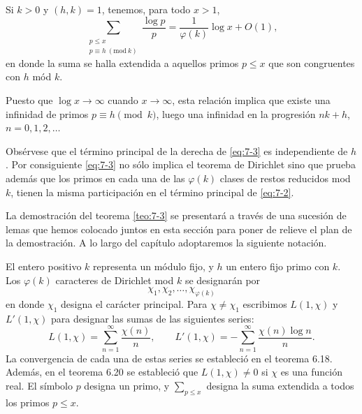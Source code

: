 \documentclass[12pt,a4paper]{book}
\begin{document}
    \begin{teorema}\label{teo:7-3}
        Si $k>0$ y $(h,k)=1$, tenemos, para todo $x>1$,
        \begin{equation}\label{eq:7-3}
            \sum_{\substack{p\leq x\\p\equiv h\ (\mathrm{mod}\ k)}}\frac{\log p}{p}
            =\frac{1}{\varphi(k)}\log x+O(1),
        \end{equation}
        en donde la suma se halla extendida a aquellos primos $p\leq x$ que son
        congruentes con $h$ mód $k$.
    \end{teorema}

    Puesto que $\log x\to\infty$ cuando $x\to\infty$, esta relación implica que existe una
    infinidad de primos $p\equiv h\pmod{k}$, luego una infinidad en la progresión
    $nk+h$, $n=0,1,2,\dots$

    Obsérvese que el término principal de la derecha de \eqref{eq:7-3} es independiente de
    $h$. Por consiguiente \eqref{eq:7-3} no sólo implica el teorema de Dirichlet sino que
    prueba además que los primos en cada una de las $\varphi(k)$ clases de restos
    reducidos mod $k$, tienen la misma participación en el término principal de
    \eqref{eq:7-2}.

    La demostración del teorema \ref{teo:7-3} se presentará a través de una sucesión de
    lemas que hemos colocado juntos en esta sección para poner de relieve el plan de la
    demostración. A lo largo del capítulo adoptaremos la siguiente notación.

    El entero positivo $k$ representa un módulo fijo, y $h$ un entero fijo primo con $k$.
    Los $\varphi(k)$ caracteres de Dirichlet mod $k$ se designarán por
    \begin{equation*}
        \chi_{1},\chi_{2},\dots,\chi_{\varphi(k)}
    \end{equation*}
    en donde $\chi_{1}$ designa el carácter principal. Para $\chi\neq\chi_{1}$ escribimos
    $L(1,\chi)$ y $L'(1,\chi)$ para designar las sumas de las siguientes series:\label{sim:L1}\label{sim:L1p}
    \begin{equation*}
        L(1,\chi)=\sum_{n=1}^{\infty}\frac{\chi(n)}{n},\qquad
        L'(1,\chi)=-\sum_{n=1}^{\infty}\frac{\chi(n)\log n}{n}.
    \end{equation*}
    La convergencia de cada una de estas series se estableció en el teorema 6.18. Además,
    en el teorema 6.20 se estableció que $L(1,\chi)\neq0$ si $\chi$ es una función real.
    El símbolo $p$ designa un primo, y $\sum_{p\leq x}$ designa la suma extendida a todos
    los primos $p\leq x$.
\end{document}
